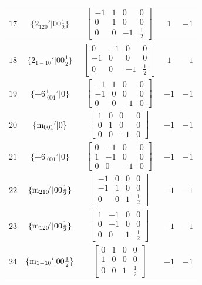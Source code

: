 \documentclass[fleqn,8pt]{jsarticle}
\begin{document}
\begin{longtable}{ccccc}
$ 17 $ & $ \{2{}_{120}{}'|0 0 \frac{1}{2}\} $ & $ \begin{bmatrix} -1 & 1 & 0 & 0 \\ 0 & 1 & 0 & 0 \\ 0 & 0 & -1 & \frac{1}{2} \end{bmatrix} $ & $ 1 $ & $ -1 $ \\ \hline
$ 18 $ & $ \{2{}_{1-10}{}'|0 0 \frac{1}{2}\} $ & $ \begin{bmatrix} 0 & -1 & 0 & 0 \\ -1 & 0 & 0 & 0 \\ 0 & 0 & -1 & \frac{1}{2} \end{bmatrix} $ & $ 1 $ & $ -1 $ \\ \hline
$ 19 $ & $ \{-6^{+}_{\,\,001}{}'|0\} $ & $ \begin{bmatrix} -1 & 1 & 0 & 0 \\ -1 & 0 & 0 & 0 \\ 0 & 0 & -1 & 0 \end{bmatrix} $ & $ -1 $ & $ -1 $ \\ \hline
$ 20 $ & $ \{{\rm m}_{001}{}'|0\} $ & $ \begin{bmatrix} 1 & 0 & 0 & 0 \\ 0 & 1 & 0 & 0 \\ 0 & 0 & -1 & 0 \end{bmatrix} $ & $ -1 $ & $ -1 $ \\ \hline
$ 21 $ & $ \{-6^{-}_{\,\,001}{}'|0\} $ & $ \begin{bmatrix} 0 & -1 & 0 & 0 \\ 1 & -1 & 0 & 0 \\ 0 & 0 & -1 & 0 \end{bmatrix} $ & $ -1 $ & $ -1 $ \\ \hline
$ 22 $ & $ \{{\rm m}_{210}{}'|0 0 \frac{1}{2}\} $ & $ \begin{bmatrix} -1 & 0 & 0 & 0 \\ -1 & 1 & 0 & 0 \\ 0 & 0 & 1 & \frac{1}{2} \end{bmatrix} $ & $ -1 $ & $ -1 $ \\ \hline
$ 23 $ & $ \{{\rm m}_{120}{}'|0 0 \frac{1}{2}\} $ & $ \begin{bmatrix} 1 & -1 & 0 & 0 \\ 0 & -1 & 0 & 0 \\ 0 & 0 & 1 & \frac{1}{2} \end{bmatrix} $ & $ -1 $ & $ -1 $ \\ \hline
$ 24 $ & $ \{{\rm m}_{1-10}{}'|0 0 \frac{1}{2}\} $ & $ \begin{bmatrix} 0 & 1 & 0 & 0 \\ 1 & 0 & 0 & 0 \\ 0 & 0 & 1 & \frac{1}{2} \end{bmatrix} $ & $ -1 $ & $ -1 $ \\
\end{longtable}
\end{document}
